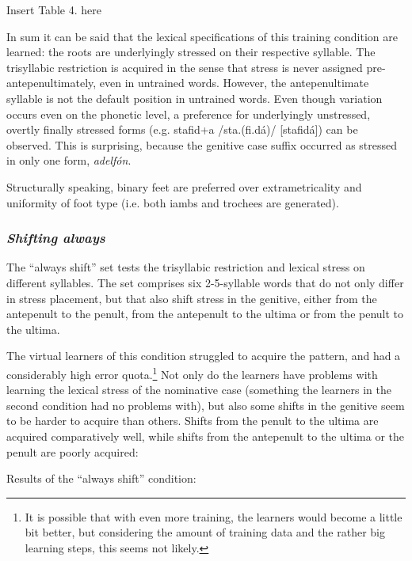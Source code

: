 \documentclass[a4paper]{article}
\begin{document}
{\centering
Insert Table 4. here
\par}

In sum it can be said that the lexical specifications of this training condition are learned: the roots are underlyingly stressed on their respective syllable. The trisyllabic restriction is acquired in the sense that stress is never assigned pre-antepenultimately, even in untrained words. However, the antepenultimate syllable is not the default position in untrained words. Even though variation occurs even on the phonetic level, a preference for underlyingly unstressed, overtly finally stressed forms (e.g. {\textbar}stafid+a{\textbar} /sta.(fi.dá)/ [stafidá]) can be observed. This is surprising, because the genitive case suffix occurred as stressed in only one form, \textit{adelfón}.

Structurally speaking, binary feet are preferred over extrametricality and uniformity of foot type (i.e. both iambs and trochees are generated).

\subsubsection{\itshape
Shifting always}

The “always shift” set tests the trisyllabic restriction and lexical stress on different syllables. The set comprises six 2-5-syllable words that do not only differ in stress placement, but that also shift stress in the genitive, either from the antepenult to the penult, from the antepenult to the ultima or from the penult to the ultima.

The virtual learners of this condition struggled to acquire the pattern, and had a considerably high error quota.\footnote{ It is possible that with even more training, the learners would become a little bit better, but considering the amount of training data and the rather big learning steps, this seems not likely.} Not only do the learners have problems with learning the lexical stress of the nominative case (something the learners in the second condition had no problems with), but also some shifts in the genitive seem to be harder to acquire than others. Shifts from the penult to the ultima are acquired comparatively well, while shifts from the antepenult to the ultima or the penult are poorly acquired:

\ea Results of the “always shift” condition:
\end{document}
